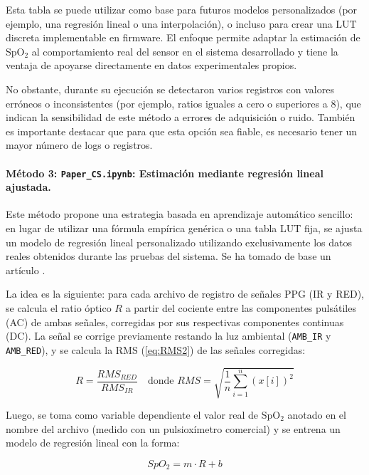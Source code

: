 Esta tabla se puede utilizar como base para futuros modelos personalizados (por ejemplo, una regresión lineal o una interpolación), o incluso para crear una LUT discreta implementable en firmware. El enfoque permite adaptar la estimación de SpO$_2$ al comportamiento real del sensor en el sistema desarrollado y tiene la ventaja de apoyarse directamente en datos experimentales propios.

No obstante, durante su ejecución se detectaron varios registros con valores erróneos o inconsistentes (por ejemplo, ratios iguales a cero o superiores a 8), que indican la sensibilidad de este método a errores de adquisición o ruido. También es importante destacar que para que esta opción sea fiable, es necesario tener un mayor número de logs o registros.


\paragraph{Método 3: \texttt{Paper\_CS.ipynb}: Estimación mediante regresión lineal ajustada.}

Este método propone una estrategia basada en aprendizaje automático sencillo: en lugar de utilizar una fórmula empírica genérica o una tabla LUT fija, se ajusta un modelo de regresión lineal personalizado utilizando exclusivamente los datos reales obtenidos durante las pruebas del sistema. Se ha tomado de base un artículo \cite{mohan2010blood}.

La idea es la siguiente: para cada archivo de registro de señales PPG (IR y RED), se calcula el ratio óptico \( R \) a partir del cociente entre las componentes pulsátiles (AC) de ambas señales, corregidas por sus respectivas componentes continuas (DC). La señal se corrige previamente restando la luz ambiental (\texttt{AMB\_IR} y \texttt{AMB\_RED}), y se calcula la RMS (\ref{eq:RMS2}) de las señales corregidas:

\begin{equation}
R = \frac{RMS_{RED}}{RMS_{IR}} \quad \text{donde   }   RMS = \sqrt{\frac{1}{n} \sum_{i=1}^{n} (x[i])^2}
\label{eq:RMS2}
\end{equation}

Luego, se toma como variable dependiente el valor real de SpO$_2$ anotado en el nombre del archivo (medido con un pulsioxímetro comercial) y se entrena un modelo de regresión lineal con la forma:

\begin{equation}
SpO_2 = m \cdot R + b
\end{equation}

